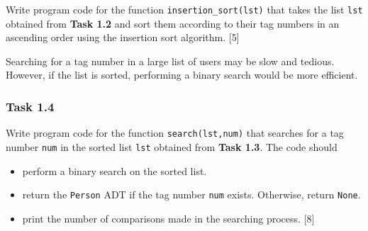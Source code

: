 Write program code for the function \texttt{insertion\_sort(lst)}
that takes the list \texttt{lst} obtained from \textbf{Task 1.2} and
sort them according to their tag numbers in an ascending order using
the insertion sort algorithm.\hfill{} {[}5{]}

Searching for a tag number in a large list of users may be slow and
tedious. However, if the list is sorted, performing a binary search
would be more efficient. 

\subsubsection*{Task 1.4 }

Write program code for the function \texttt{search(lst,num)} that
searches for a tag number \texttt{num} in the sorted list \texttt{lst}
obtained from \textbf{Task 1.3}. The code should 
\begin{itemize}
\item perform a binary search on the sorted list. 
\item return the \texttt{Person} ADT if the tag number \texttt{num} exists.
Otherwise, return \texttt{None}. 
\item print the number of comparisons made in the searching process.\hfill{}
{[}8{]}
\end{itemize}